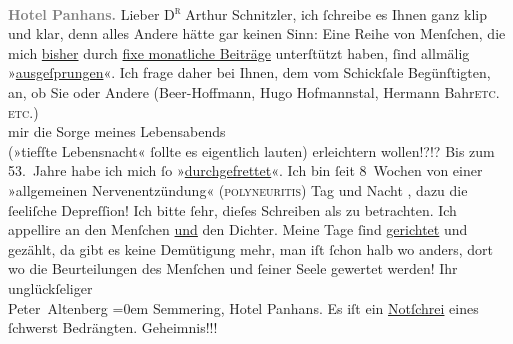\begin{ledgroupsized}[t]{13cm}
           \pstart
           \raggedleft{}\textcolor{gray}{\textbf{Hotel Panhans.}}\pend
           \pstart{}Lieber \textsc{D\textsuperscript{r}} Arthur Schnitzler,\pend\pstart
           ich ſchreibe es Ihnen ganz klip und klar, denn alles Andere hätte gar keinen
               Sinn:\pend
           \pstart
           Eine Reihe von Menſchen, die mich \uline{bisher} durch \uline{fixe monatliche Beiträge} unterſtützt haben, ſind
               allmälig »\uline{ausgeſprungen}«. Ich frage daher bei Ihnen,
               dem vom Schickſale Begünſtigten, an, ob Sie oder Andere (Beer-Hoffmann, Hugo
                  Hofmannstal, Hermann Bahr\textsc{etc. etc.}) {\\}mir die Sorge meines
               Lebensabends{\\}(»tiefſte Lebensnacht« ſollte es eigentlich lauten) erleichtern
               wollen!?!? \introOben{}Bis zum 53. Jahre habe ich mich ſo »\uline{durchgefrettet}«.\introOben{}\pend
           \pstart
           {\pb}Ich bin ſeit 8 Wochen von einer
               »allgemeinen Nervenentzündung« (\textsc{polyneuritis}) Tag und Nacht
                  , dazu die ſeeliſche Depreſſion!\pend
           \pstart
           Ich bitte ſehr, dieſes Schreiben als  zu
               betrachten. \introOben{}Ich appellire an den Menſchen \uline{und} den Dichter.\introOben{}\pend
           \pstart
           Meine Tage ſind \uline{gerichtet} und gezählt, da gibt es
               keine Demütigung mehr, man iſt ſchon halb wo anders, dort wo die Beurteilungen des
               Menſchen und ſeiner Seele  gewertet werden!\pend
           \pstart
           Ihr unglückſeliger{\\[\baselineskip]}\spacefill\mbox{Peter Altenberg}\pend
           \leftskip=0em{}\pstart
           \noindent{}Semmering, Hotel Panhans.\pend
           \pstart
           Es iſt ein \uline{Notſchrei} eines ſchwerst
                  Bedrängten.\pend
           \pstart
           \raggedleft{}Geheimnis!!!\pend
                     \endnumbering{}\end{ledgroupsized}  \newcommand{\dateiname}{L02094}\newcommand{\titel}{Peter Altenberg an Arthur Schnitzler, [7. 11. 1912]}\newcommand{\editorInnen}{ Martin Anton Müller und Gerd-Hermann Susen}
            \footnotesize
\begin{ledgroupsized}[t]{11.5cm}
\end{ledgroupsized}
         
      
